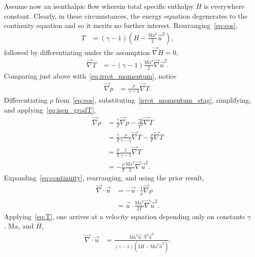 \documentclass[letterpaper,11pt,nointlimits,reqno]{amsart}
\newcommand{\Mach}[1][]{\mbox{Ma}_{#1}}
\begin{document}
Assume now an isenthalpic flow wherein total specific enthalpy $H$ is
everywhere constant. Clearly, in these circumstances, the energy equation
degenerates to the continuity equation and so it merits no further interest.
Rearranging~\eqref{eq:eos},
\begin{align}
  T &= \left(\gamma-1\right)\left(H - \frac{\Mach^2}{2}\vec{u}^2\right),
  \label{eq:T}
\end{align}
followed by differentiating under the assumption $\vec{\nabla}H=0$,
\begin{align}
  \vec{\nabla} T &= -\left(\gamma-1\right)\frac{\Mach^2}{2}\vec{\nabla}\vec{u}^2.
  \label{eq:isen_gradT}
\end{align}
Comparing just above with~\eqref{eq:irrot_momentum}, notice
\begin{align}
  \vec{\nabla}p &= \frac{\rho}{\gamma-1}\vec{\nabla}T.
  \label{irrot_momentum_stag}
\end{align}
Differentiating $\rho$ from~\eqref{eq:eos},
substituting~\eqref{irrot_momentum_stag}, simplifying,
and applying~\eqref{eq:isen_gradT},
\begin{align}
  \vec{\nabla}\rho
  &=
  \frac{\gamma}{T} \vec{\nabla}p
  -
  \frac{\gamma p}{T^2} \vec{\nabla}T
\\&=
  \frac{\gamma}{T} \frac{\rho}{\gamma-1} \vec{\nabla}T
  -
  \frac{\rho}{T} \vec{\nabla}T
\\&=
  \frac{\rho}{T}
  \frac{1}{\gamma-1}
  \vec{\nabla}T
\\&=
  -
  \frac{\rho}{T}
  \frac{\Mach^2}{2}\vec{\nabla}\vec{u}^2.
  \label{eq:rho}
\end{align}
Expanding~\eqref{eq:continuity}, rearranging, and using the prior result,
\begin{align}
  \vec{\nabla}\cdot\vec{u}
  &= -\vec{u}\cdot\frac{1}{\rho}\vec{\nabla}\rho
\\
  &= \vec{u}\cdot \frac{\Mach^2}{2T}\vec{\nabla}\vec{u}^2.
\end{align}
Applying~\eqref{eq:T}, one arrives at a velocity equation depending
only on constants $\gamma$, $\Mach$, and $H$,
\begin{align}
  \vec{\nabla}\cdot\vec{u}
  &= \frac{\Mach^2 \vec{u}\cdot \vec{\nabla}\vec{u}^2}
          {\left(\gamma-1\right)\left(2H - \Mach^2 \vec{u}^2\right)}.
  \label{eq:gibbsresult}
\end{align}
\end{document}
